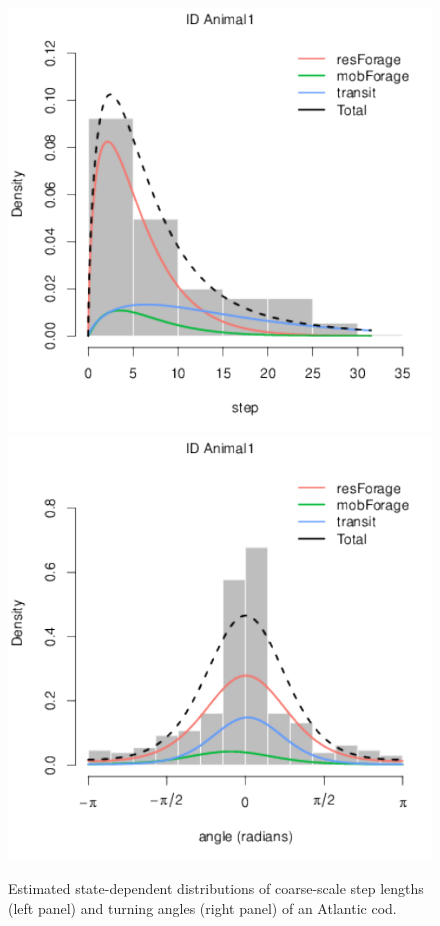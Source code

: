 \documentclass[12pt]{article}\usepackage[]{graphicx}\usepackage[]{xcolor}
\begin{document}
\begin{figure}[htbp]
  \centering
  \includegraphics[width=.49\textwidth]{plot_codExample001.pdf}
  \includegraphics[width=.49\textwidth]{plot_codExample002.pdf}
  \caption{Estimated state-dependent distributions of coarse-scale step lengths (left panel) and turning angles (right panel) of an Atlantic
cod.}
  \label{fig:codDists}
\end{figure}
\end{document}
